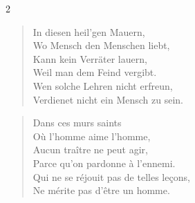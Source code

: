 \documentclass[a4paper,12pt]{article}
\newcommand\chunks[2]{%
\begin{leftcolumn*}\begin{otherlanguage}{german}%
{#1}%
\end{otherlanguage}\end{leftcolumn*}%
\begin{rightcolumn}\begin{otherlanguage}{french}%
{#2}%
\end{otherlanguage}\end{rightcolumn}%
}
\begin{document}
\begin{paracol}{2}
  \chunks{\begin{verse}
          In diesen heil’gen Mauern,\\
          Wo Mensch den Menschen liebt,\\
          Kann kein Verräter lauern,\\
          Weil man dem Feind vergibt.\\
          Wen solche Lehren nicht erfreun,\\
          Verdienet nicht ein Mensch zu sein.
          \end{verse}}
         {\begin{verse}
          Dans ces murs saints\\
          Où l’homme aime l’homme,\\
          Aucun traître ne peut agir,\\
          Parce qu’on pardonne à l’ennemi.\\
          Qui ne se réjouit pas de telles leçons,\\
          Ne mérite pas d’être un homme.
          \end{verse}}
\end{paracol}
\end{document}
